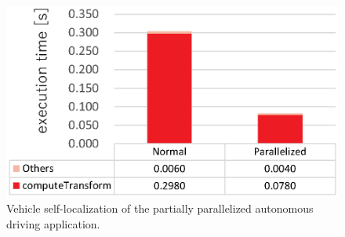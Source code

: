 \documentclass[conference,compsoc]{IEEEtran}
\newcommand{\comment}[1]{}
\begin{document}
\begin{figure}[t]
  \centering
  \includegraphics[width=0.8\linewidth]{../figure/BarGraph_ndt_matching.eps}
  \vspace{-3mm}
  \caption{\label{fig:ndt_matching}
  Vehicle self-localization of the partially parallelized autonomous driving application.}
  \vspace{-5mm}
\end{figure}


\end{document}
